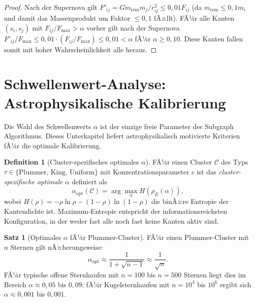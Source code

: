 ﻿\documentclass[a4paper,12pt]{report}
\theoremstyle{definition}
\newtheorem{definition}{Definition}
\newtheorem{satz}{Satz}
\begin{document}
\begin{proof}
Nach der Supernova gilt $F'_{ij} = G m_\mathrm{rem} m_j / r_{ij}^2 \leq 0{,}01 F_{ij}$ (da $m_\mathrm{rem} \leq 0{,}1 m_i$ und damit das Massenprodukt um Faktor $\leq 0{,}1$ fÃ¤llt). FÃ¼r alle Kanten $(s_i, s_j)$ mit $F_{ij}/F_\mathrm{max} > \alpha$ vorher gilt nach der Supernova $F'_{ij}/F_\mathrm{max} \leq 0{,}01 \cdot (F_{ij}/F_\mathrm{max}) \leq 0{,}01 < \alpha$ fÃ¼r $\alpha \geq 0{,}10$. Diese Kanten fallen somit mit hoher Wahrscheinlichkeit alle heraus.
\end{proof}

\section{Schwellenwert-Analyse: Astrophysikalische Kalibrierung}
\label{sec:kalibrierung}

Die Wahl des Schwellenwerts $\alpha$ ist der einzige freie Parameter des Subgraph Algorithmus. Dieses Unterkapitel liefert astrophysikalisch motivierte Kriterien fÃ¼r die optimale Kalibrierung.

\begin{definition}[Cluster-spezifisches optimales $\alpha$]
\label{def:alpha_cluster}
FÃ¼r einen Cluster $\mathcal{C}$ des Typs $\tau \in \{\mathrm{Plummer},\, \mathrm{King},\, \mathrm{Uniform}\}$ mit Konzentrations\-parameter $c$ ist das \emph{cluster-spezifische optimale $\alpha$} definiert als
\[
\alpha_\mathrm{opt}(\mathcal{C}) = \arg\max_{\alpha} H(\rho_E(\alpha)),
\]
wobei $H(\rho) = -\rho \ln \rho - (1-\rho)\ln(1-\rho)$ die binÃ¤re Entropie der Kantendichte ist. Maximum-Entropie entspricht der informationsreichsten Konfiguration, in der weder fast alle noch fast keine Kanten aktiv sind.
\end{definition}

\begin{satz}[Optimales $\alpha$ fÃ¼r Plummer-Cluster]
\label{satz:plummer_alpha}
FÃ¼r einen Plummer-Cluster mit $n$ Sternen gilt nÃ¤herungsweise:
\[
\alpha_\mathrm{opt} \approx \frac{1}{1 + \sqrt{n-1}} \approx \frac{1}{\sqrt{n}}.
\]
FÃ¼r typische offene Sternhaufen mit $n = 100$ bis $n = 500$ Sternen liegt dies im Bereich $\alpha \approx 0{,}05$ bis $0{,}09$; fÃ¼r Kugelsternhaufen mit $n = 10^4$ bis $10^6$ ergibt sich $\alpha \approx 0{,}001$ bis $0{,}001$.
\end{satz}
\end{document}
